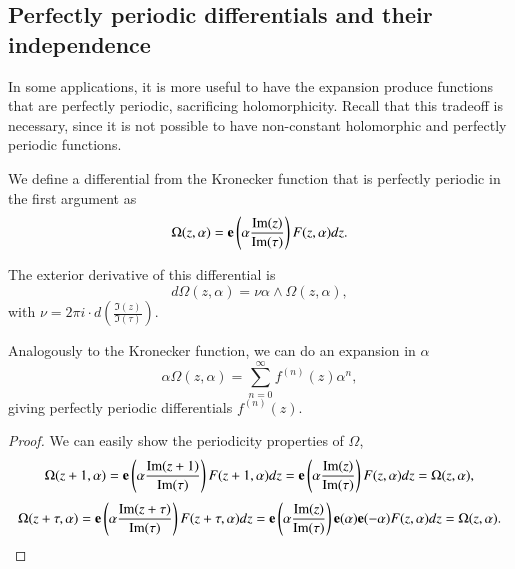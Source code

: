 \subsection{Perfectly periodic differentials and their independence}

In some applications, it is more useful to have the expansion produce functions that are perfectly periodic, sacrificing holomorphicity.
Recall that this tradeoff is necessary, since it is not possible to have non-constant holomorphic and perfectly periodic functions.

\begin{definition}
    We define a differential from the Kronecker function that is perfectly periodic in the first argument as
    \begin{equation}
        \Omega(z,\alpha) = \mathbf{e}\left( \alpha \frac{\operatorname{Im}(z)}{\operatorname{Im}(\tau)}\right) F(z,\alpha) dz.
    \end{equation}

    The exterior derivative of this differential is
    \begin{equation}
        d\Omega(z,\alpha) = \nu \alpha \wedge \Omega(z,\alpha),
    \end{equation}
    with $\nu = 2 \pi i \cdot d\!\left(\frac{\Im(z)}{\Im(\tau)}\right)$.

    Analogously to the Kronecker function, we can do an expansion in $\alpha$
    \begin{equation}
        \alpha \Omega(z,\alpha) = \sum_{n=0}^\infty f^{(n)}(z) \alpha^n,
    \end{equation}
    giving perfectly periodic differentials $f^{(n)}(z)$.
\end{definition}

\begin{proof}
    We can easily show the periodicity properties of $\Omega$,
    \begin{equation}
        \Omega(z+1,\alpha) = \mathbf{e}\left( \alpha \frac{\operatorname{Im}(z+1)}{\operatorname{Im}(\tau)}\right) F(z+1,\alpha) dz = \mathbf{e}\left( \alpha \frac{\operatorname{Im}(z)}{\operatorname{Im}(\tau)}\right) F(z,\alpha) dz = \Omega(z,\alpha),
    \end{equation}
    \begin{equation}
        \Omega(z+\tau,\alpha) = \mathbf{e}\left( \alpha \frac{\operatorname{Im}(z+\tau)}{\operatorname{Im}(\tau)} \right) F(z+\tau,\alpha) dz = \mathbf{e}\left( \alpha \frac{\operatorname{Im}(z)}{\operatorname{Im}(\tau)}\right) \mathbf{e}(\alpha) \mathbf{e}(-\alpha) F(z,\alpha) dz = \Omega(z,\alpha).
    \end{equation}
\end{proof}

